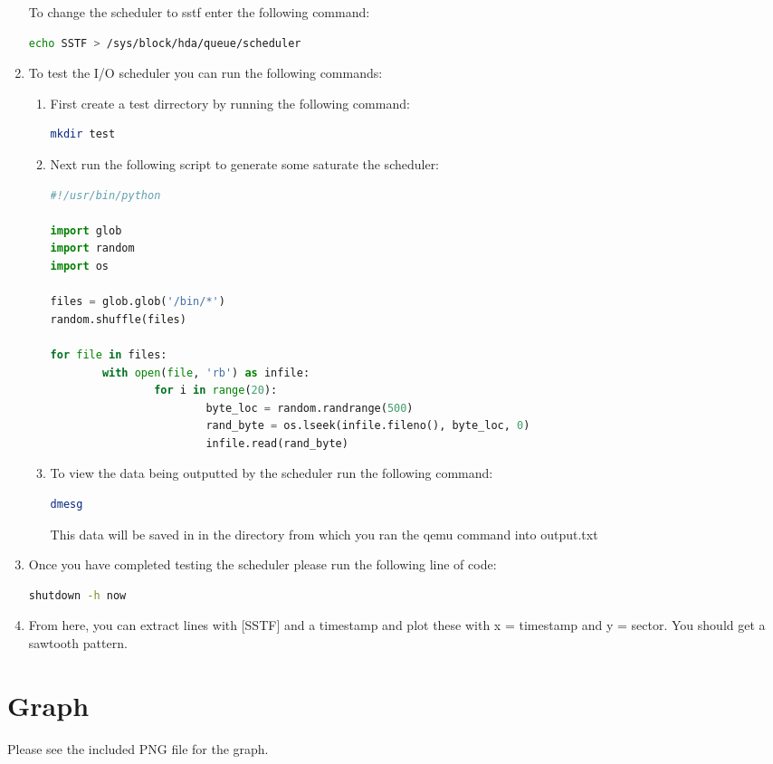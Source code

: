 \documentclass[letterpaper, onecolumn, draftclsnofoot, 10pt, compsoc]{IEEEtran}
\begin{document}
\begin{singlespace}
\begin{enumerate}
        To change the scheduler to sstf enter the following command:
        \begin{lstlisting}[language=bash]
echo SSTF > /sys/block/hda/queue/scheduler
            \end{lstlisting}
        \item To test the I/O scheduler you can run the following commands:
            \begin{enumerate}
                \item First create a test dirrectory by running the following command:
                    \begin{lstlisting}[language=bash]
mkdir test
                    \end{lstlisting}
                \item Next run the following script to generate some saturate the scheduler:
                    \begin{lstlisting}[language=python]
#!/usr/bin/python

import glob
import random
import os

files = glob.glob('/bin/*')
random.shuffle(files)

for file in files:
        with open(file, 'rb') as infile:
                for i in range(20):
                        byte_loc = random.randrange(500)
                        rand_byte = os.lseek(infile.fileno(), byte_loc, 0)
                        infile.read(rand_byte)

                    \end{lstlisting}
                \item To view the data being outputted by the scheduler run the following command:
                    \begin{lstlisting}[language=bash]
dmesg
                    \end{lstlisting}
                This data will be saved in in the directory from which you ran the qemu command into output.txt
            \end{enumerate}
        \item Once you have completed testing the scheduler please run the following line of code:
        \begin{lstlisting}[language=bash]
shutdown -h now
            \end{lstlisting}
        \item From here, you can extract lines with [SSTF] and a timestamp and plot these with x = timestamp and y = sector. You should get a sawtooth pattern.
    \end{enumerate}
    \end{singlespace}
    
\section{Graph}
Please see the included PNG file for the graph.
\end{document}
